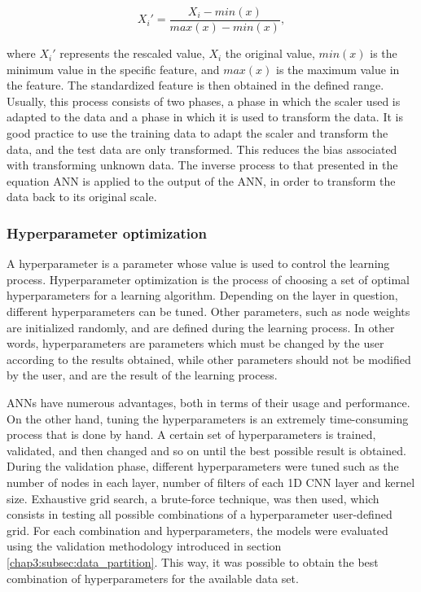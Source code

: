 \begin{equation}
     X_i' = \frac{X_i - min(x) }{max(x)-min(x)},
\label{minmax}
\end{equation}

where $X_i'$ represents the rescaled value, $X_i$ the original value, $min(x)$ is the minimum value in the specific feature, and $max(x)$ is the maximum value in the feature. The standardized feature is then obtained in the defined range. Usually, this process consists of two phases, a phase in which the scaler used is adapted to the data and a phase in which it is used to transform the data. It is good practice to use the training data to adapt the scaler and transform the data, and the test data are only transformed. This reduces the bias associated with transforming unknown data. The inverse process to that presented in the equation \ac{ANN} is applied to the output of the \ac{ANN}, in order to transform the data back to its original scale.



\subsubsection{Hyperparameter optimization} \label{chap3:subsubsec:hyperparameter_optimization}

A hyperparameter is a parameter whose value is used to control the learning process. Hyperparameter optimization is the process of choosing a set of optimal hyperparameters for a learning algorithm. Depending on the layer in question, different hyperparameters can be tuned. Other parameters, such as node weights are initialized randomly, and are defined during the learning process. In other words, hyperparameters are parameters which must be changed by the user according to the results obtained, while other parameters should not be modified by the user, and are the result of the learning process.

\ac{ANN}s have numerous advantages, both in terms of their usage and performance. On the other hand, tuning the hyperparameters is an extremely time-consuming process that is done by hand. A certain set of hyperparameters is trained, validated, and then changed and so on until the best possible result is obtained. During the validation phase, different hyperparameters were tuned such as the number of nodes in each layer, number of filters of each \ac{1D CNN} layer and kernel size. Exhaustive grid search, a brute-force technique, was then used, which consists in testing all possible combinations of a hyperparameter user-defined grid. For each combination and hyperparameters, the models were evaluated using the validation methodology introduced in section \ref{chap3:subsec:data_partition}. This way, it was possible to obtain the best combination of hyperparameters for the available data set.

